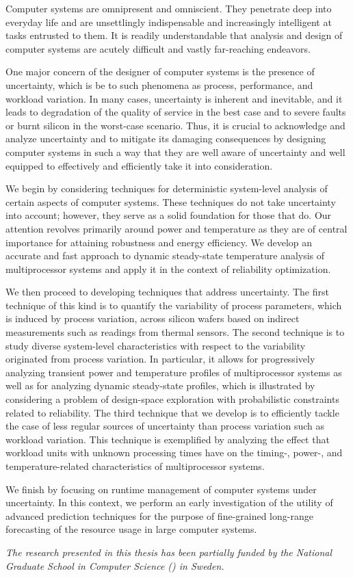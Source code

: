 Computer systems are omnipresent and omniscient. They penetrate deep into
everyday life and are unsettlingly indispensable and increasingly intelligent at
tasks entrusted to them. It is readily understandable that analysis and design
of computer systems are acutely difficult and vastly far-reaching endeavors.

One major concern of the designer of computer systems is the presence of
uncertainty, which is be to such phenomena as process, performance, and workload
variation. In many cases, uncertainty is inherent and inevitable, and it leads
to degradation of the quality of service in the best case and to severe faults
or burnt silicon in the worst-case scenario. Thus, it is crucial to acknowledge
and analyze uncertainty and to mitigate its damaging consequences by designing
computer systems in such a way that they are well aware of uncertainty and well
equipped to effectively and efficiently take it into consideration.

We begin by considering techniques for deterministic system-level analysis of
certain aspects of computer systems. These techniques do not take uncertainty
into account; however, they serve as a solid foundation for those that do. Our
attention revolves primarily around power and temperature as they are of central
importance for attaining robustness and energy efficiency. We develop an
accurate and fast approach to dynamic steady-state temperature analysis of
multiprocessor systems and apply it in the context of reliability optimization.

We then proceed to developing techniques that address uncertainty. The first
technique of this kind is to quantify the variability of process parameters,
which is induced by process variation, across silicon wafers based on indirect
measurements such as readings from thermal sensors. The second technique is to
study diverse system-level characteristics with respect to the variability
originated from process variation. In particular, it allows for progressively
analyzing transient power and temperature profiles of multiprocessor systems as
well as for analyzing dynamic steady-state profiles, which is illustrated by
considering a problem of design-space exploration with probabilistic constraints
related to reliability. The third technique that we develop is to efficiently
tackle the case of less regular sources of uncertainty than process variation
such as workload variation. This technique is exemplified by analyzing the
effect that workload units with unknown processing times have on the timing-,
power-, and temperature-related characteristics of multiprocessor systems.

We finish by focusing on runtime management of computer systems under
uncertainty. In this context, we perform an early investigation of the utility
of advanced prediction techniques for the purpose of fine-grained long-range
forecasting of the resource usage in large computer systems.

\vspace{1em}
\noindent
\emph{The research presented in this thesis has been partially funded by the
National Graduate School in Computer Science () in Sweden.}
